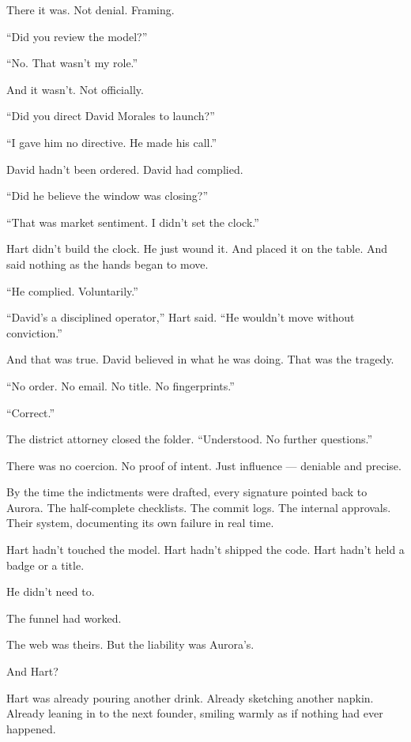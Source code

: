 There it was.
Not denial. Framing.

“Did you review the model?”

“No. That wasn’t my role.”

And it wasn’t. Not officially.

“Did you direct David Morales to launch?”

“I gave him no directive. He made his call.”

David hadn’t been ordered.
David had complied.

“Did he believe the window was closing?”

“That was market sentiment. I didn’t set the clock.”

Hart didn’t build the clock. He just wound it.
And placed it on the table.
And said nothing as the hands began to move.

“He complied. Voluntarily.”

“David’s a disciplined operator,” Hart said. “He wouldn’t move without conviction.”

And that was true. David believed in what he was doing.
That was the tragedy.

“No order. No email. No title. No fingerprints.”

“Correct.”

The district attorney closed the folder.
“Understood. No further questions.”

There was no coercion. No proof of intent.
Just influence — deniable and precise.

By the time the indictments were drafted, every signature pointed back to Aurora.
The half-complete checklists.
The commit logs.
The internal approvals.
Their system, documenting its own failure in real time.

Hart hadn’t touched the model.
Hart hadn’t shipped the code.
Hart hadn’t held a badge or a title.

He didn’t need to.

The funnel had worked.

The web was theirs.
But the liability was Aurora’s.

And Hart?

Hart was already pouring another drink.
Already sketching another napkin.
Already leaning in to the next founder,
smiling warmly
as if nothing had ever happened.




